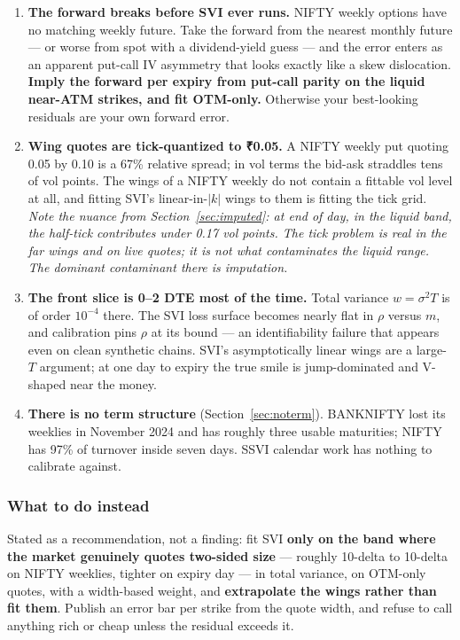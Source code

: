 \documentclass[11pt,a4paper]{article}
\newcommand{\rs}{₹}
\begin{document}
\begin{enumerate}
\item \textbf{The forward breaks before SVI ever runs.} NIFTY weekly options have
no matching weekly future. Take the forward from the nearest monthly future --- or
worse from spot with a dividend-yield guess --- and the error enters as an
apparent put-call IV asymmetry that looks exactly like a skew dislocation.
\textbf{Imply the forward per expiry from put-call parity on the liquid near-ATM
strikes, and fit OTM-only.} Otherwise your best-looking residuals are your own
forward error.

\item \textbf{Wing quotes are tick-quantized to \rs 0.05.} A NIFTY weekly put
quoting 0.05 by 0.10 is a 67\% relative spread; in vol terms the bid-ask straddles
tens of vol points. The wings of a NIFTY weekly do not contain a fittable vol
level at all, and fitting SVI's linear-in-$|k|$ wings to them is fitting the tick
grid. \emph{Note the nuance from Section~\ref{sec:imputed}: at end of day, in the
liquid band, the half-tick contributes under 0.17 vol points. The tick problem is
real in the far wings and on live quotes; it is not what contaminates the liquid
range. The dominant contaminant there is imputation.}

\item \textbf{The front slice is 0--2 DTE most of the time.} Total variance
$w = \sigma^2 T$ is of order $10^{-4}$ there. The SVI loss surface becomes nearly
flat in $\rho$ versus $m$, and calibration pins $\rho$ at its bound --- an
identifiability failure that appears even on clean synthetic chains. SVI's
asymptotically linear wings are a large-$T$ argument; at one day to expiry the
true smile is jump-dominated and V-shaped near the money.

\item \textbf{There is no term structure} (Section~\ref{sec:noterm}). BANKNIFTY
lost its weeklies in November 2024 and has roughly three usable maturities;
NIFTY has 97\% of turnover inside seven days. SSVI calendar work has nothing to
calibrate against.
\end{enumerate}

\subsubsection{What to do instead}

Stated as a recommendation, not a finding: fit SVI \textbf{only on the band where
the market genuinely quotes two-sided size} --- roughly 10-delta to 10-delta on
NIFTY weeklies, tighter on expiry day --- in total variance, on OTM-only quotes,
with a width-based weight, and \textbf{extrapolate the wings rather than fit
them}. Publish an error bar per strike from the quote width, and refuse to call
anything rich or cheap unless the residual exceeds it.
\end{document}
